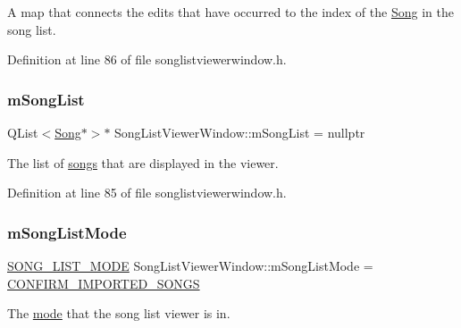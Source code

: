 A map that connects the edits that have occurred to the index of the \mbox{\hyperlink{class_song}{Song}} in the song list. 



Definition at line 86 of file songlistviewerwindow.\+h.

\mbox{\label{class_song_list_viewer_window_a02558cb095f356a1288e5663bc2e1955}} 
\subsubsection{\texorpdfstring{m\+Song\+List}{mSongList}}
{\footnotesize\ttfamily Q\+List$<$\mbox{\hyperlink{class_song}{Song}}$\ast$$>$$\ast$ Song\+List\+Viewer\+Window\+::m\+Song\+List = nullptr\hspace{0.3cm}{\ttfamily [private]}}



The list of \mbox{\hyperlink{class_song}{songs}} that are displayed in the viewer. 



Definition at line 85 of file songlistviewerwindow.\+h.

\mbox{\label{class_song_list_viewer_window_a1c242af144718150837feff19386dc73}} 
\subsubsection{\texorpdfstring{m\+Song\+List\+Mode}{mSongListMode}}
{\footnotesize\ttfamily \mbox{\hyperlink{class_song_list_viewer_window_a6f23a68c416173f6b571a2cc4990a927}{S\+O\+N\+G\+\_\+\+L\+I\+S\+T\+\_\+\+M\+O\+DE}} Song\+List\+Viewer\+Window\+::m\+Song\+List\+Mode = \mbox{\hyperlink{class_song_list_viewer_window_a6f23a68c416173f6b571a2cc4990a927a9847037eeae7688b9cddf8700d425332}{C\+O\+N\+F\+I\+R\+M\+\_\+\+I\+M\+P\+O\+R\+T\+E\+D\+\_\+\+S\+O\+N\+GS}}\hspace{0.3cm}{\ttfamily [private]}}



The \mbox{\hyperlink{class_song_list_viewer_window_a6f23a68c416173f6b571a2cc4990a927}{mode}} that the song list viewer is in. 



